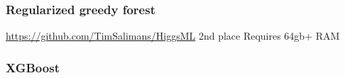 \subsubsection{Regularized greedy forest}
\url{https://github.com/TimSalimans/HiggsML}
2nd place
Requires 64gb+ RAM
\subsubsection{XGBoost}
\cite{chen14}
\pagebreak

	{\pagebreak \thispagestyle{empty} \cleardoublepage}{\clearpage}